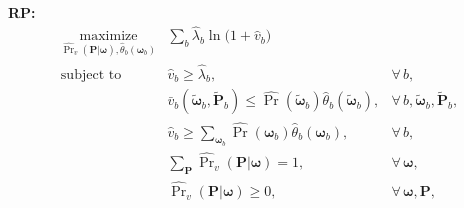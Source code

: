 \documentclass[conference]{IEEEtran}
\begin{document}
%
%
%
\\
{\bf RP:} \vspace{-10pt}
$$\begin{array}{cll}
\underset{\hat{\Pr}_v(\mathbf{P}|\boldsymbol{\omega}),\hat{\theta}_b( \boldsymbol{\omega}_b)}{\text{maximize}} & \textstyle\sum_{b}\hat{\lambda}_b\ln\big(1+\hat{v}_b\big)
%
\\ \mbox{subject to}& \hat{v}_b\geq\hat{\lambda}_b, &\forall\,b,
%
\\&\bar{v}_{b}(\tilde{\boldsymbol{\omega}}_b, \tilde{\mathbf{P}}_b)
\leq \textstyle\hat{\Pr}(\tilde{\boldsymbol{\omega}}_b)\hat{\theta}_b( \tilde{\boldsymbol{\omega}}_b) , &\forall\,b,\tilde{\boldsymbol{\omega}}_b, \tilde{\mathbf{P}}_b,
%
\\& \hat{v}_b\geq\sum_{\boldsymbol{\omega}_b} \hat{\Pr}(\boldsymbol{\omega}_b)\hat{\theta}_b( \boldsymbol{\omega}_b), &\forall\,b,
%
\\& \textstyle\sum_{\mathbf{P}} \hat{\Pr}_v(\mathbf{P}|  \boldsymbol{\omega})=1, &\forall\,\boldsymbol{\omega},
%
\\& \textstyle\hat{\Pr}_v(\mathbf{P}|  \boldsymbol{\omega})\geq 0, &\forall\,\boldsymbol{\omega}, \mathbf{P},
\end{array}$$
\end{document}
